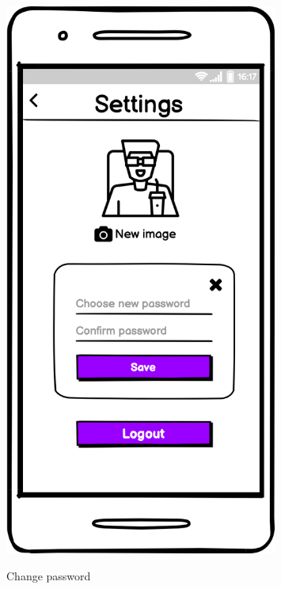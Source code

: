 \documentclass[12pt, a4paper]{article}
\numberwithin{figure}{section}
\begin{document}
\begin{center}
\begin{minipage}{0.3\textwidth}
\begin{figure}[H]
			\includegraphics[width=0.8\textwidth]{images/mockups/User setting password.png}\\
			\caption{Change password}
		\end{figure}
	\end{minipage}	
\end{center}
\end{document}
